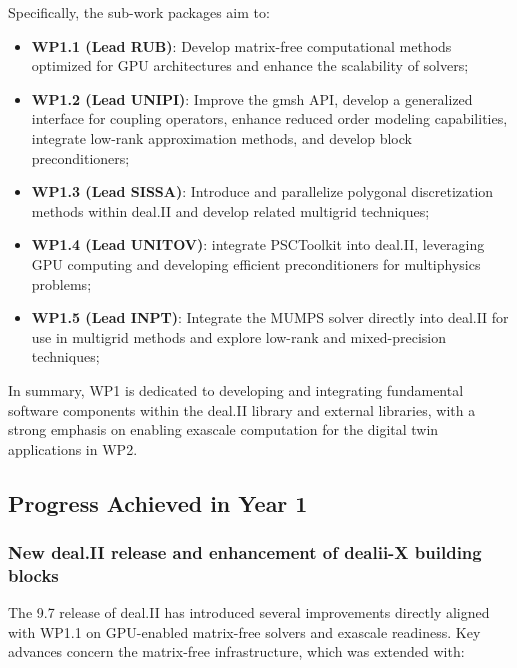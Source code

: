 \documentclass[a4paper,12pt, numbers]{article}
\begin{document}
	Specifically, the sub-work packages aim to:
	\begin{itemize}
		\item \textbf{WP1.1 (Lead RUB)}: Develop matrix-free computational methods optimized for GPU architectures and enhance the scalability of solvers;
		\item \textbf{WP1.2 (Lead UNIPI)}: Improve the gmsh API, develop a generalized interface for coupling operators, enhance reduced order modeling capabilities, integrate low-rank approximation methods, and develop block preconditioners;
		\item \textbf{WP1.3 (Lead SISSA)}: Introduce and parallelize polygonal discretization methods within deal.II and develop related multigrid techniques;
		\item \textbf{WP1.4 (Lead UNITOV)}: integrate PSCToolkit into deal.II, leveraging GPU computing and developing efficient preconditioners for multiphysics problems;
		\item \textbf{WP1.5 (Lead INPT)}: Integrate the MUMPS solver directly into deal.II for use in multigrid methods and explore low-rank and mixed-precision techniques;
	\end{itemize}
	
	In summary, WP1 is dedicated to developing and integrating fundamental software components within the deal.II library and external libraries, with a strong emphasis on enabling exascale computation for the digital twin applications in WP2.
	
	\subsection{Progress Achieved in Year 1} %
	
	\subsubsection*{New deal.II release and enhancement of dealii-X building blocks}
	
	The 9.7 release of deal.II has introduced several improvements directly aligned
	with WP1.1 on GPU-enabled matrix-free solvers and exascale readiness.  
	Key advances concern the matrix-free infrastructure, which was extended with:
	
\end{document}

